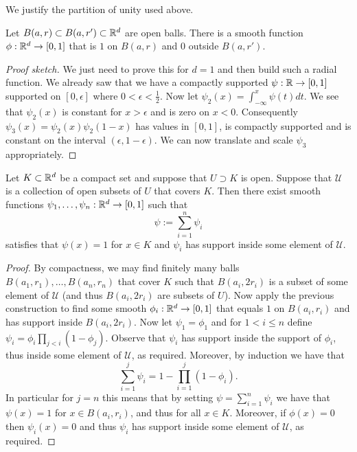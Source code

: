 \documentclass[twoside, a4paper, 10pt]{amsart}
\begin{document}
We justify the partition of unity used above.

\begin{prop} Let $B(a,r) \subset B(a,r') \subset \mathbb{R}^d$ are open balls. There is a smooth function $\phi:\mathbb{R}^d \to [0,1]$ that is $1$ on $B(a,r)$ and $0$ outside $B(a,r')$. 

\end{prop}

\begin{proof}[Proof sketch] We just need to prove this for $d=1$ and then build such a radial function. We already saw that we have a compactly supported $\psi:\mathbb{R} \to [0,1]$ supported on $[0,\epsilon]$ where $0<\epsilon<\frac{1}{2}$. Now let $\psi_2(x) = \int_{-\infty}^x \psi(t) dt$. We see that $\psi_2(x)$ is constant for $x>\epsilon$ and is zero on $x<0$. Consequently $\psi_3(x) = \psi_2(x) \psi_2(1-x)$ has values in $[0,1]$, is compactly supported and is constant on the interval $(\epsilon, 1 - \epsilon)$. We can now translate and scale $\psi_3$ appropriately. \end{proof}

\begin{prop} Let $K \subset \mathbb{R}^d$ be a compact set and suppose that $U \supset K$ is open. Suppose that $\mathcal{U}$ is a collection of open subsets of $U$ that covers $K$. Then there exist smooth functions $\psi_1, \ldots, \psi_n:\mathbb{R}^d \to [0,1]$ such that $$\psi := \sum_{i=1}^n \psi_i$$ satisfies that $\psi(x)=1$ for $x \in K$ and $\psi_i$ has support inside some element of $\mathcal{U}$.

\end{prop}

\begin{proof} By compactness, we may find finitely many balls $B(a_1,r_1), \ldots , B(a_n,r_n)$ that cover $K$ such that $B(a_i,2r_i)$ is a subset of some element of $\mathcal{U}$ (and thus $B(a_i, 2r_i)$ are subsets of $U$). Now apply the previous construction to find some smooth $\phi_i:\mathbb{R}^d \to [0,1]$ that equals $1$ on $B(a_i,r_i)$ and has support inside $B(a_i,2r_i)$. Now let $\psi_1 = \phi_1$ and for $1<i\leq n$ define $\psi_i = \phi_i \prod_{j<i} (1 - \phi_j)$. Observe that $\psi_i$ has support inside the support of $\phi_i$, thus inside some element of $\mathcal{U}$, as required. Moreover, by induction we have that $$\sum_{i=1}^j \psi_i = 1 - \prod_{i=1}^j (1-\phi_i).$$ In particular for $j=n$ this means that by setting $\psi = \sum_{i=1}^n \psi_i$ we have that $\psi(x) = 1$ for $x \in B(a_ i, r_i)$, and thus for all $x \in K$. Moreover, if $\phi(x)=0$ then $\psi_i(x) = 0$ and thus $\psi_i$ has support inside some element of $\mathcal{U}$, as required. \end{proof}
\end{document}
